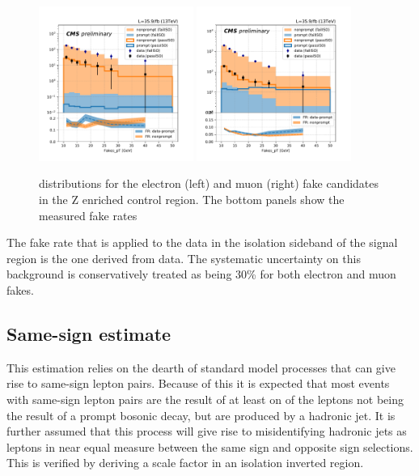 \begin{figure}
    \centering
    \includegraphics[width=0.45\textwidth]{chapters/Analysis/sectionBackground/figures/e_fakerate}
    \includegraphics[width=0.45\textwidth]{chapters/Analysis/sectionBackground/figures/mu_fakerate}
    \caption{\pt distributions for the electron (left) and muon (right) fake candidates in the Z enriched control region.  The bottom panels show the measured fake rates}
    \label{fig:lepton_fr}
\end{figure}





The fake rate that is applied to the data in the isolation sideband of the signal region is the one derived from data.  The systematic uncertainty on this background is conservatively treated as being 30\% for both electron and muon fakes.  

\FloatBarrier



\subsection{Same-sign estimate}

This estimation relies on the dearth of standard model processes that can give rise to same-sign lepton pairs.  Because of this it is expected that most events with same-sign lepton pairs are the result of at least on of the leptons not being the result of a prompt bosonic decay, but are produced by a hadronic jet.  It is further assumed that this process will give rise to misidentifying hadronic jets as leptons in near equal measure between the same sign and opposite sign selections.  This is verified by deriving a scale factor in an isolation inverted region.

